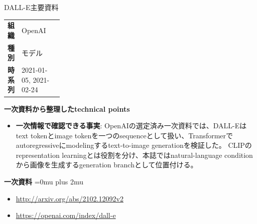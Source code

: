 \begin{technicalnote}{DALL-E}{主要資料}
\begingroup
\begin{tabularx}{\linewidth}{@{}>{\bfseries}p{0.22\linewidth}X@{}}
組織 & OpenAI \\
種別 & モデル \\
時系列 & 2021-01-05, 2021-02-24 \\
\end{tabularx}
\smallskip
{\bfseries 一次資料から整理したtechnical points}
\begin{itemize}[leftmargin=1.5em,itemsep=0.35em]
\item \textbf{一次情報で確認できる事実}: OpenAIの選定済み一次資料では、DALL-Eはtext tokenとimage tokenを一つのsequenceとして扱い、Transformerでautoregressiveにmodelingするtext-to-image generationを検証した。 CLIPのrepresentation learningとは役割を分け、本誌ではnatural-language conditionから画像を生成するgeneration branchとして位置付ける。
\end{itemize}
\begin{minipage}{\linewidth}
\begin{samepage}
{\bfseries 一次資料}
\begingroup\sloppy
\Urlmuskip=0mu plus 2mu\relax
\begin{itemize}[leftmargin=1.5em,itemsep=0.25em]
\item {\scriptsize\url{http://arxiv.org/abs/2102.12092v2}}
\item {\scriptsize\url{https://openai.com/index/dall-e}}
\end{itemize}
\endgroup
\end{samepage}
\end{minipage}
\endgroup
\end{technicalnote}
\medskip
